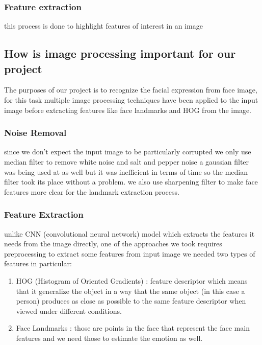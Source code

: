 \subsubsection{Feature extraction}
this process is done to highlight features of interest in an image 


\subsection{How is image processing important for our project}
The purposes of our project is to recognize the facial expression from face image, for this task multiple image 
processing techniques have been applied to the input image before extracting features like face landmarks and HOG from the image.

\subsubsection{Noise Removal}
since we don't expect the input image to be particularly corrupted we only use median filter to 
remove white noise and salt and pepper noise a gaussian filter was being used at as well but 
it was inefficient in terms of time so the median filter took its place without a problem.
we also use sharpening filter to make face features more clear for the landmark extraction process.

\subsubsection{Feature Extraction}
unlike CNN (convolutional neural network) model which extracts the features it needs from the image directly, 
one of the approaches we took requires preprocessing to extract some features from input image
we needed two types of features in particular:
\begin{enumerate}
	\item HOG (Histogram of Oriented Gradients) : feature descriptor which means that it generalize the object in a way that the same object (in this case a person) produces as close as possible to the same feature descriptor when viewed under different conditions.
	\item Face Landmarks : those are points in the face that represent the face main features and we need those to estimate the emotion as well.
\end{enumerate}
